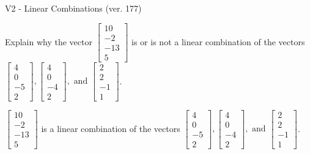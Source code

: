 \begin{exercise}
  \begin{exerciseTitle}V2 - Linear Combinations (ver. 177)\end{exerciseTitle}
  \begin{exerciseStatement}
    Explain why the vector \(\left[\begin{array}{c}
10 \\
-2 \\
-13 \\
5
\end{array}\right]\)  is or is not a linear 
	combination of the vectors \(\left[\begin{array}{c}
4 \\
0 \\
-5 \\
2
\end{array}\right] , \left[\begin{array}{c}
4 \\
0 \\
-4 \\
2
\end{array}\right] , \text{ and } \left[\begin{array}{c}
2 \\
2 \\
-1 \\
1
\end{array}\right]\).
	


  \end{exerciseStatement}
  \begin{exerciseAnswer}
   \(\left[\begin{array}{c}
10 \\
-2 \\
-13 \\
5
\end{array}\right]\) 
  	 is  
	a linear combination of the vectors \(\left[\begin{array}{c}
4 \\
0 \\
-5 \\
2
\end{array}\right] , \left[\begin{array}{c}
4 \\
0 \\
-4 \\
2
\end{array}\right] , \text{ and } \left[\begin{array}{c}
2 \\
2 \\
-1 \\
1
\end{array}\right]\).

	
  


  \end{exerciseAnswer}
\end{exercise}